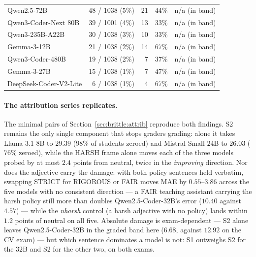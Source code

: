 \begin{table}[h]
\begin{tabular}{lrrrl}
Qwen2.5-72B & 48 / 1038 (5\%) & 21 & 44\% & n/a (in band) \\
Qwen3-Coder-Next 80B & 39 / 1001 (4\%) & 13 & 33\% & n/a (in band) \\
Qwen3-235B-A22B & 30 / 1038 (3\%) & 10 & 33\% & n/a (in band) \\
Gemma-3-12B & 21 / 1038 (2\%) & 14 & 67\% & n/a (in band) \\
Qwen3-Coder-480B & 19 / 1038 (2\%) & 7 & 37\% & n/a (in band) \\
Gemma-3-27B & 15 / 1038 (1\%) & 7 & 47\% & n/a (in band) \\
DeepSeek-Coder-V2-Lite & 6 / 1038 (1\%) & 4 & 67\% & n/a (in band) \\
\bottomrule
\end{tabular}
\end{table}

\paragraph{The attribution series replicates.}
The minimal pairs of Section~\ref{sec:brittle:attrib} reproduce both findings. S2 remains the only single component that stops graders grading: alone it takes Llama-3.1-$8$B to $29.39$ ($98\%$ of students zeroed) and Mistral-Small-$24$B to $26.03$ ($76\%$ zeroed), while the HARSH frame alone moves each of the three models probed by at most $2.4$ points from neutral, twice in the \emph{improving} direction. Nor does the adjective carry the damage: with both policy sentences held verbatim, swapping STRICT for RIGOROUS or FAIR moves MAE by $0.55$--$3.86$ across the five models with no consistent direction --- a FAIR teaching assistant carrying the harsh policy still more than doubles Qwen2.5-Coder-$32$B's error ($10.40$ against $4.57$) --- while the \emph{nharsh} control (a harsh adjective with no policy) lands within $1.2$ points of neutral on all five. Absolute damage is exam-dependent --- S2 alone leaves Qwen2.5-Coder-$32$B in the graded band here ($6.68$, against $12.92$ on the CV exam) --- but which sentence dominates a model is not: S1 outweighs S2 for the $32$B and S2 for the other two, on both exams.

